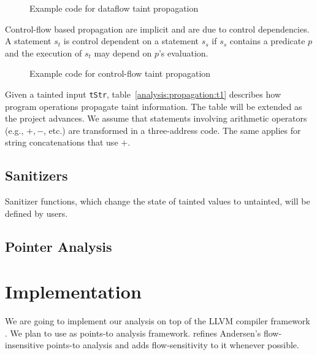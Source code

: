\begin{figure}[!h]
\begin{center}
\end{center}
\caption{Example code for dataflow taint propagation}
\label{fig:dfpropagation}
\end{figure}

Control-flow based propagation are implicit and are due to
control dependencies. A statement $s_t$ is control dependent on
a statement $s_s$ if $s_s$ contains a predicate $p$ and the execution
of $s_t$ may depend on $p$'s evaluation.

\begin{figure}[!h]
\begin{center}
\end{center}
\caption{Example code for control-flow taint propagation}
\label{fig:cfpropagation}
\end{figure}

Given a tainted input \texttt{tStr}, table~\ref{analysis:propagation:t1}
describes how program operations propagate taint information. The table
will be extended as the project advances.
We assume that statements involving arithmetic operators (e.g., $+, -$, etc.)
are transformed in a three-address code. The same applies for string
concatenations that use $+$.

\subsection{Sanitizers}\label{analysis:sanitizers}

Sanitizer functions, which change the state of tainted values
to untainted, will be defined by users.

\subsection{Pointer Analysis}\label{analysis:pointers}

\section{Implementation}

We are going to implement our analysis on top of the LLVM
compiler framework \cite{Lattner:2004:LLVM}.
We plan to use \cite{Lhotak:2011:PAE} as points-to analysis
framework. \cite{Lhotak:2011:PAE} refines Andersen's
flow-insensitive points-to analysis and adds flow-sensitivity
to it whenever possible.